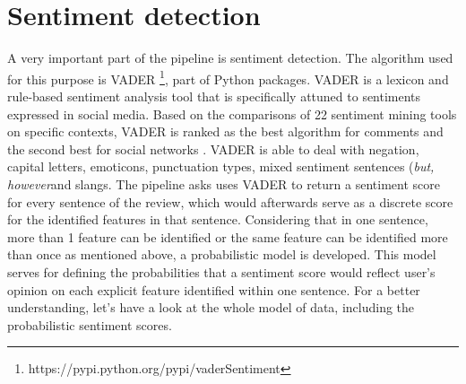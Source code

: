 \section{Sentiment detection}
A very important part of the pipeline is sentiment detection. The algorithm used for this purpose is VADER \footnote{https://pypi.python.org/pypi/vaderSentiment}, part of Python packages. VADER is a lexicon and rule-based sentiment analysis tool that is specifically attuned to sentiments expressed in social media. Based on the comparisons of 22 sentiment mining tools on specific contexts, VADER is ranked as the best algorithm for comments and the second best for social networks \cite{ribeiro2015benchmark}.
VADER is able to deal with negation, capital letters, emoticons, punctuation types, mixed sentiment sentences (\textit{but, however}and slangs. The pipeline asks uses VADER to return a sentiment score for every sentence of the review, which would afterwards serve as a discrete score for the identified features in that sentence. Considering that in one sentence, more than 1 feature can be identified or the same feature can be identified more than once as mentioned above, a probabilistic model is developed. This model serves for defining the probabilities that a sentiment score would reflect user's opinion on each explicit feature identified within one sentence. For a better understanding, let's have a look at the whole model of data, including the probabilistic sentiment scores.

